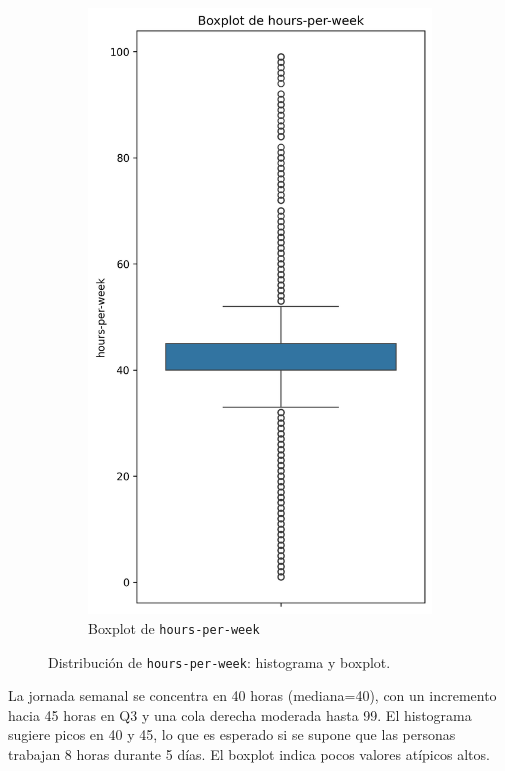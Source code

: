 \documentclass[12pt,a4paper]{article}
\begin{document}
\begin{enumerate}
\begin{figure}[H]
\begin{subfigure}[b]{0.45\textwidth}
        \includegraphics[width=\textwidth]{boxplot_hours-per-week.png}
        \caption{Boxplot de \texttt{hours-per-week}}
        \label{fig:hours_per_week_boxplot}
      \end{subfigure}
      \caption{Distribución de \texttt{hours-per-week}: histograma y boxplot.}
      \label{fig:hours_per_week_visual}
    \end{figure}

    La jornada semanal se concentra en 40 horas (mediana=40), con un incremento hacia 45 horas en Q3 y una cola derecha moderada hasta 99. 
    El histograma sugiere picos en 40 y 45, lo que es esperado si se supone que las personas trabajan 8 horas durante 5 días. El boxplot indica 
    pocos valores atípicos altos.


\end{enumerate}
\end{document}
